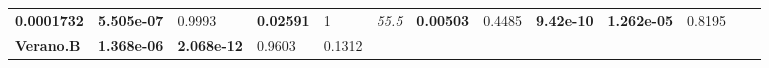 \documentclass[]{book}
\theoremstyle{definition}
\theoremstyle{definition}
\theoremstyle{definition}
\theoremstyle{remark}
\begin{document}
\begin{longtable}[]{@{}lllllllllllll@{}}
\begin{minipage}[t]{0.05\columnwidth}
\textbf{0.0001732}\strut
\end{minipage} & \begin{minipage}[t]{0.06\columnwidth}\raggedright
\textbf{5.505e-07}\strut
\end{minipage} & \begin{minipage}[t]{0.05\columnwidth}\raggedright
0.9993\strut
\end{minipage} & \begin{minipage}[t]{0.05\columnwidth}\raggedright
\textbf{0.02591}\strut
\end{minipage} & \begin{minipage}[t]{0.05\columnwidth}\raggedright
1\strut
\end{minipage} & \begin{minipage}[t]{0.06\columnwidth}\raggedright
\emph{55.5}\strut
\end{minipage} & \begin{minipage}[t]{0.05\columnwidth}\raggedright
\textbf{0.00503}\strut
\end{minipage} & \begin{minipage}[t]{0.05\columnwidth}\raggedright
0.4485\strut
\end{minipage} & \begin{minipage}[t]{0.05\columnwidth}\raggedright
\textbf{9.42e-10}\strut
\end{minipage} & \begin{minipage}[t]{0.06\columnwidth}\raggedright
\textbf{1.262e-05}\strut
\end{minipage} & \begin{minipage}[t]{0.05\columnwidth}\raggedright
0.8195\strut
\end{minipage}\tabularnewline
\begin{minipage}[t]{0.06\columnwidth}\raggedright
\textbf{Verano.B}\strut
\end{minipage} & \begin{minipage}[t]{0.05\columnwidth}\raggedright
\textbf{1.368e-06}\strut
\end{minipage} & \begin{minipage}[t]{0.05\columnwidth}\raggedright
\textbf{2.068e-12}\strut
\end{minipage} & \begin{minipage}[t]{0.06\columnwidth}\raggedright
0.9603\strut
\end{minipage} & \begin{minipage}[t]{0.05\columnwidth}\raggedright
0.1312\strut
\end{minipage} & \begin{minipage}[t]{0.05\columnwidth}\raggedright

\end{minipage}
\end{longtable}
\end{document}
